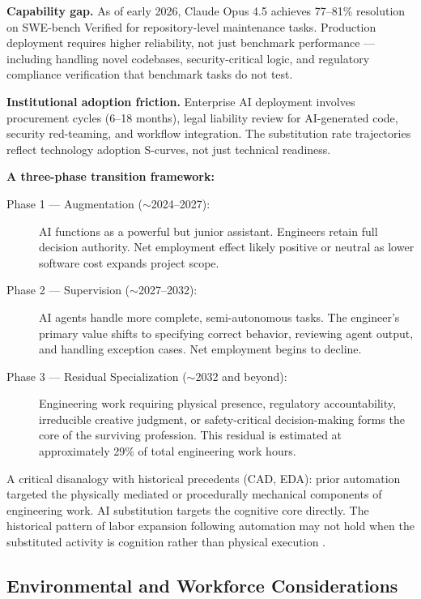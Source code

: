 \documentclass{article}
\begin{document}
\textbf{Capability gap.} As of early 2026, Claude Opus 4.5 achieves 77--81\% resolution
on SWE-bench Verified \citep{swebench2026,anthropic2025opus45} for repository-level maintenance
tasks. Production deployment requires higher reliability, not just benchmark performance ---
including handling novel codebases, security-critical logic, and regulatory compliance
verification that benchmark tasks do not test.

\textbf{Institutional adoption friction.} Enterprise AI deployment involves procurement
cycles (6--18 months), legal liability review for AI-generated code, security red-teaming,
and workflow integration. The substitution rate trajectories reflect technology adoption
S-curves, not just technical readiness.

\textbf{A three-phase transition framework:}
\begin{description}
  \item[Phase 1 --- Augmentation ($\sim$2024--2027):] AI functions as a powerful
    but junior assistant. Engineers retain full decision authority. Net employment effect
    likely positive or neutral as lower software cost expands project scope.
  \item[Phase 2 --- Supervision ($\sim$2027--2032):] AI agents handle more complete,
    semi-autonomous tasks. The engineer's primary value shifts to specifying correct behavior,
    reviewing agent output, and handling exception cases. Net employment begins to decline.
  \item[Phase 3 --- Residual Specialization ($\sim$2032 and beyond):] Engineering work
    requiring physical presence, regulatory accountability, irreducible creative judgment,
    or safety-critical decision-making forms the core of the surviving profession. This
    residual is estimated at approximately 29\% of total engineering work hours.
\end{description}

A critical disanalogy with historical precedents (CAD, EDA): prior automation targeted the
physically mediated or procedurally mechanical components of engineering work. AI
substitution targets the cognitive core directly. The historical pattern of labor expansion
following automation may not hold when the substituted activity is cognition rather than
physical execution \citep{acemoglu2022tasks,autor2013skills,brynjolfsson2023generative}.

\subsection{Environmental and Workforce Considerations}
\label{sec:risks}
\end{document}
